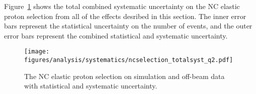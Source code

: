     Figure~\ref{fig:systall} shows the total combined systematic uncertainty on
    the NC elastic proton selection from all of the effects desribed in this
    section. The inner error bars represent the statistical uncertainty on the
    number of events, and the outer error bars represent the combined
    statistical and systematic uncertainty.
    \begin{figure}[ht]
      \centering
      \texttt{[image: figures/analysis/systematics/ncselection\_totalsyst\_q2.pdf]}
      \caption{The NC elastic proton selection on simulation and off-beam data
      with statistical and systematic uncertainty.}
      \label{fig:systall}
    \end{figure}

